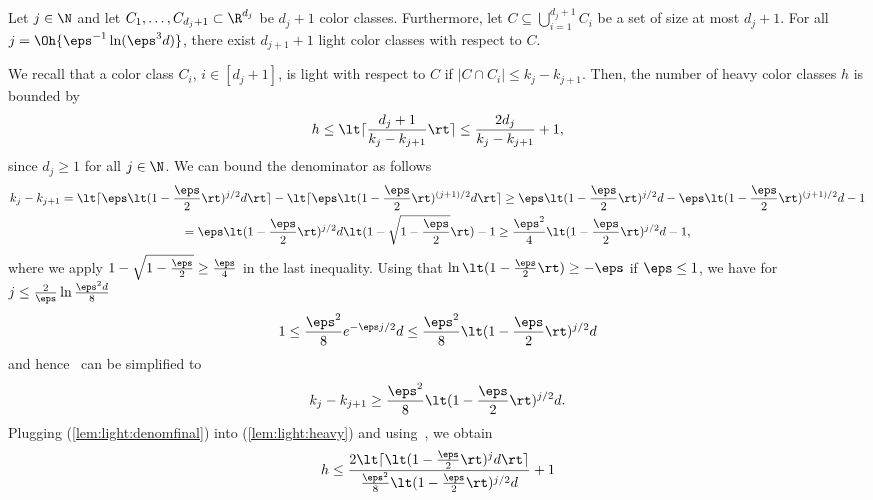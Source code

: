 \begin{lemma}\label{lem:light}
  Let $j \in \N$ and let $C_1,\dots,C_{d_j+1}\subset \R^{d_j}$ be 
  $d_j+1$ color classes.
  Furthermore, let $C \subseteq \bigcup_{i=1}^{d_j+1} C_i$ be a set 
  of size at most $d_j+1$. For all $j=\Oh{\eps^{-1} \ln (\eps^3 d)}$, 
  there exist $d_{j+1}+1$ light color classes with respect to $C$.
\end{lemma}
\begin{prf}
We recall that a color class $C_i$, $i \in [d_j+1]$, is light with 
respect to $C$ if $|C \cap C_i| \leq k_j - k_{j+1}$. Then, the 
number of heavy color classes $h$ is bounded by
\begin{equation}\label{lem:light:heavy}
  h \leq \lt\lceil\frac{d_j + 1}{k_j - k_{j+1}}\rt\rceil \leq
  \frac{2 d_j}{k_j - k_{j+1}} + 1,
\end{equation}
since $d_j \geq 1$ for all $j \in \N$. We can bound the denominator 
as follows
\begin{multline}\label{lem:light:denom}
    k_j - k_{j+1}
    = \lt\lceil \eps \lt(1-\frac{\eps}{2}\rt)^{j/2} d\rt\rceil
        - \lt\lceil \eps \lt(1-\frac{\eps}{2}\rt)^{(j+1)/2} d\rt\rceil
    \geq \eps \lt(1-\frac{\eps}{2}\rt)^{j/2} d
        - \eps \lt(1-\frac{\eps}{2}\rt)^{(j+1)/2} d - 1
    \\
    = \eps \lt(1-\frac{\eps}{2}\rt)^{j/2} d 
    \lt( 1 - \sqrt{1-\frac{\eps}{2}}\rt) - 1
    \geq \frac{\eps^2}{4} \lt(1-\frac{\eps}{2}\rt)^{j/2} d - 1,
\end{multline}
where we apply $1 - \sqrt{1 - \frac{\eps}{2}} \geq \frac{\eps}{4}$ in 
the last
inequality.  Using that $\ln\lt(1-\frac{\eps}{2}\rt) \geq -\eps$ if 
$\eps \leq 1$, we have for $j \leq \frac{2}{\eps} \ln \frac{\eps^2 d}{8}$
\begin{equation}\label{lem:light:denomsim}
1 \leq 
\frac{\eps^{2}}{8} e^{-\eps j/2} d \leq
\frac{\eps^2}{8} \lt(1-\frac{\eps}{2}\rt)^{j/2} d
\end{equation}
and hence~ can be simplified to
\begin{equation}\label{lem:light:denomfinal}
    k_j - k_{j+1} \geq \frac{\eps^2}{8} \lt(1-\frac{\eps}{2}\rt)^{j/2} d.
\end{equation}
Plugging (\ref{lem:light:denomfinal}) into (\ref{lem:light:heavy}) and
using~,
we obtain
\begin{equation*}\label{lem:light:heavyfinal}
  h \leq \frac{2 \lt\lceil \lt(1-\frac{\eps}{2}\rt)^j d\rt\rceil}
  {\frac{\eps^2}{8}
      \lt(1-\frac{\eps}{2}\rt)^{j/2} d} + 1

\end{equation*}
\end{prf}
